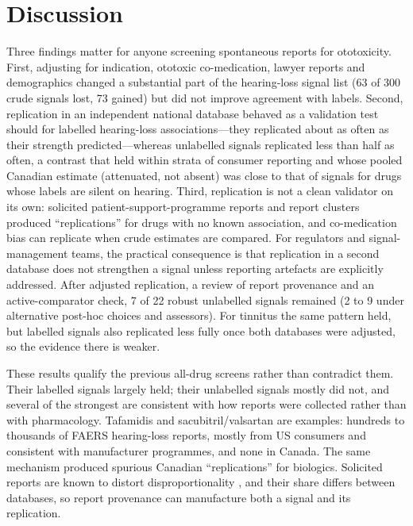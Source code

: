 \documentclass[11pt]{article}
\begin{document}
\section{Discussion}
Three findings matter for anyone screening spontaneous reports for ototoxicity. First, adjusting for indication, ototoxic
co-medication, lawyer reports and demographics changed a substantial part of the hearing-loss signal list
(63 of 300 crude signals lost, 73 gained) but did not
improve agreement with labels. Second, replication in an independent national database behaved as a validation test should
for labelled hearing-loss associations---they replicated about as often as their strength predicted---whereas unlabelled
signals replicated less than half as often, a contrast that held within strata of consumer reporting and whose pooled
Canadian estimate (attenuated, not absent) was close to that of signals for drugs whose labels are silent on hearing. Third,
replication is not a clean validator on its own: solicited patient-support-programme reports and report clusters produced
``replications'' for drugs with no known association, and co-medication bias can replicate when crude estimates are compared.
For regulators and signal-management teams, the practical consequence is that replication in a second database does not
strengthen a signal unless reporting artefacts are explicitly addressed.
After adjusted replication, a review of report provenance and an active-comparator check, 7 of 22 robust unlabelled
signals remained (2 to 9 under alternative post-hoc choices and assessors). For tinnitus the same pattern held,
but labelled signals also replicated less fully once both databases were adjusted, so the evidence there is weaker.

These results qualify the previous all-drug screens \cite{li2024,wu2025,liu2025} rather than contradict them. Their
labelled signals largely held; their unlabelled signals mostly did not, and several of the strongest are consistent with how
reports were collected rather than with pharmacology. Tafamidis and sacubitril/valsartan are examples: hundreds to thousands
of FAERS hearing-loss reports, mostly from US consumers and consistent with manufacturer programmes, and none in Canada. The same mechanism
produced spurious Canadian ``replications'' for biologics. Solicited reports are known to distort disproportionality
\cite{psp_solicited}, and their share differs between databases, so report provenance can manufacture both a signal and its
replication.
\end{document}

